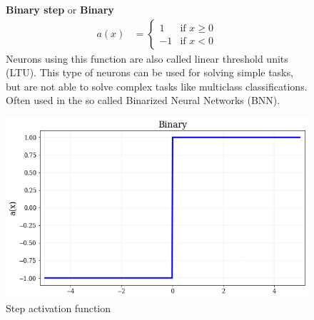 \begin{figure}[!h]
\begin{minipage}{0.5\textwidth}
    \textbf{Binary step} or \textbf{Binary}
      \begin{align}
        a(x) &=
        \begin{cases}
        1   & \text{if } x \geq 0 \\
        -1  & \text{if } x < 0 
  \end{cases}
\end{align}
Neurons using this function are also called linear threshold units (LTU). This type of neurons can be used for solving simple tasks, but are not able to solve complex tasks like multiclass classifications. Often used in the so called Binarized Neural Networks (BNN).
\end{minipage}
\hfill
\begin{minipage}{0.45\textwidth}

    \centering
\includegraphics[width=\textwidth]{sections/03/Images/Binary.png}
\caption{Step activation function}
    \label{fig:act_step}
\end{minipage}
\end{figure}  


